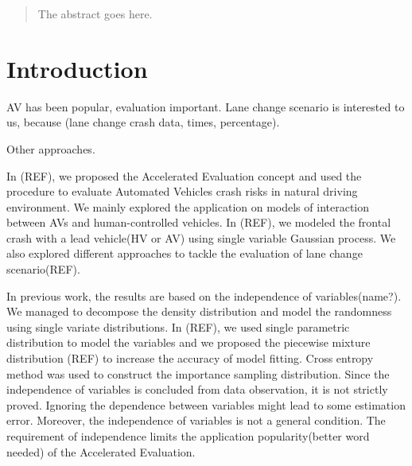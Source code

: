 \documentclass[conference]{IEEEtran}
\begin{document}




\maketitle

\begin{abstract}
The abstract goes here.
\end{abstract}





%
\IEEEpeerreviewmaketitle



\section{Introduction}

AV has been popular, evaluation important. Lane change scenario is interested to us, because (lane change crash data, times, percentage).

Other approaches.

In (REF), we proposed the Accelerated Evaluation concept and used the procedure to evaluate Automated Vehicles crash risks in natural driving environment. We mainly explored the application on models of interaction between AVs and human-controlled vehicles. In (REF), we modeled the frontal crash with a lead vehicle(HV or AV) using single variable Gaussian process. We also explored different approaches to tackle the evaluation of lane change scenario(REF). 

In previous work, the results are based on the independence of variables(name?). We managed to decompose the density distribution and model the randomness using single variate distributions.  In (REF), we used single parametric distribution to model the variables and we proposed the piecewise mixture distribution (REF) to increase the accuracy of model fitting. Cross entropy method was used to construct the importance sampling distribution. Since the independence of variables is concluded from data observation, it is not strictly proved. Ignoring the dependence between variables might lead to some estimation error. Moreover, the independence of variables is not a general condition. The requirement of independence limits the application popularity(better word needed) of the Accelerated Evaluation.
\end{document}
